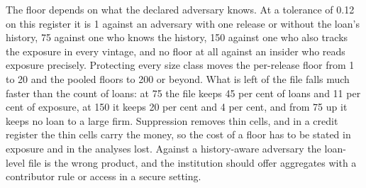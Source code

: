 The floor depends on what the declared adversary knows. At a tolerance of 0.12 on
this register it is 1 against an adversary with one release or without the loan's
history, 75 against one who knows the history, 150 against one who also tracks the
exposure in every vintage, and no floor at all against an insider who reads exposure
precisely. Protecting every size class moves the per-release floor from 1 to 20 and
the pooled floors to 200 or beyond. What is left of the file falls much faster than
the count of loans: at 75 the file keeps 45 per cent of loans and 11 per cent of
exposure, at 150 it keeps 20 per cent and 4 per cent, and from 75 up it keeps no loan
to a large firm. Suppression removes thin cells, and in a credit register the thin
cells carry the money, so the cost of a floor has to be stated in exposure and in the
analyses lost. Against a history-aware adversary the loan-level file is the wrong
product, and the institution should offer aggregates with a contributor rule or
access in a secure setting.

